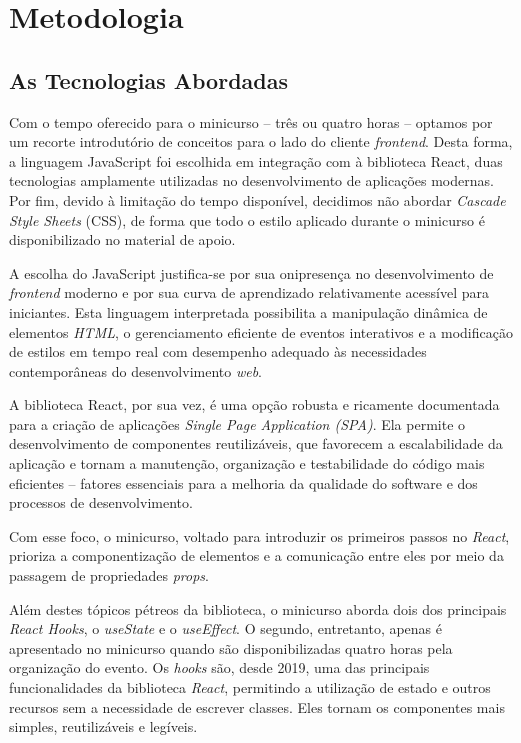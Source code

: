 \section{Metodologia}%
\label{sec:metodologia}

\subsection{As Tecnologias Abordadas}

Com o tempo oferecido para o minicurso -- três ou quatro horas -- optamos por um recorte introdutório de conceitos para o lado do cliente \textit{frontend}. Desta forma, a linguagem JavaScript foi escolhida em integração com à biblioteca React, duas tecnologias amplamente utilizadas no desenvolvimento de aplicações modernas. Por fim, devido à limitação do tempo disponível, decidimos não abordar \textit{Cascade Style Sheets} (CSS), de forma que todo o estilo aplicado durante o minicurso é disponibilizado no material de apoio.

A escolha do JavaScript justifica-se por sua onipresença no desenvolvimento de \textit{frontend} moderno e por sua curva de aprendizado relativamente acessível para iniciantes. Esta linguagem interpretada possibilita a manipulação dinâmica de elementos \textit{HTML}, o gerenciamento eficiente de eventos interativos e a modificação de estilos em tempo real com desempenho adequado às necessidades contemporâneas do desenvolvimento \textit{web}.

A biblioteca React, por sua vez, é uma opção robusta e ricamente documentada para a criação de aplicações \textit{Single Page Application (SPA)}. Ela permite o desenvolvimento de componentes reutilizáveis, que favorecem a escalabilidade da aplicação e tornam a manutenção, organização e testabilidade do código mais eficientes -- fatores essenciais para a melhoria da qualidade do software e dos processos de desenvolvimento.

Com esse foco, o minicurso, voltado para introduzir os primeiros passos no \textit{React}, prioriza a componentização de elementos e a comunicação entre eles por meio da passagem de propriedades \textit{props}.

Além destes tópicos pétreos da biblioteca, o minicurso aborda dois dos principais \textit{React Hooks}, o \textit{useState} e o \textit{useEffect}. O segundo, entretanto, apenas é apresentado no minicurso quando são disponibilizadas quatro horas pela organização do evento. Os \textit{hooks} são, desde 2019, uma das principais funcionalidades da biblioteca \textit{React}, permitindo a utilização de estado e outros recursos sem a necessidade de escrever classes. Eles tornam os componentes mais simples, reutilizáveis e legíveis.

